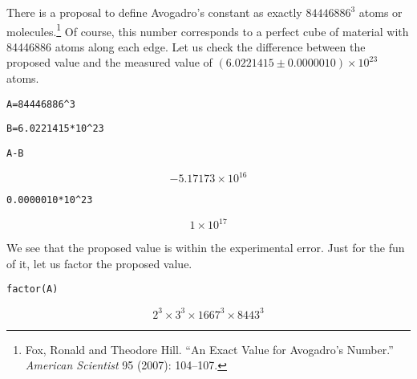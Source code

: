 \noindent
There is a proposal to define Avogadro's constant as exactly $84446886^3$
atoms or molecules.\footnote{Fox, Ronald and Theodore Hill.
``An Exact Value for Avogadro's Number.''
{\it American Scientist} 95 (2007): 104--107.}
Of course, this number corresponds to a perfect cube of material with 84446886
atoms along each edge.
Let us check the difference between the proposed value and the measured value
of $(6.0221415\pm0.0000010)\times10^{23}$ atoms.

\medskip
\verb$A=84446886^3$

\verb$B=6.0221415*10^23$

\verb$A-B$

$$-5.17173\times10^{16}$$

\verb$0.0000010*10^23$

$$1\times10^{17}$$

\medskip
\noindent
We see that the proposed value is within the experimental error.
Just for the fun of it, let us factor the proposed value.

\medskip
\verb$factor(A)$

$$2^3\times3^3\times1667^3\times8443^3$$

